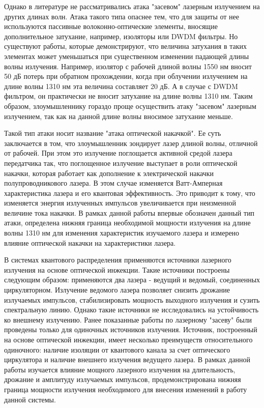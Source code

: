 Однако в литературе не рассматривались атака "засевом" лазерным излучением на других длинах волн. Атака такого типа опаснее тем, что для защиты от нее используются пассивные волоконно-оптические элементы, вносящие дополнительное затухание, например, изоляторы или DWDM фильтры. Но существуют работы, которые демонстрируют, что величина затухания в таких элементах может уменьшаться при существенном изменении падающей длины волны излучения. Например, изолятор с рабочей длиной волны 1550 нм вносит 50 дБ потерь при обратном прохождении, когда при облучении излучением на длине волны 1310 нм эта величина составляет 20 дБ. А в случае с DWDM фильтром, он практически не вносит затухание на длине волны 1310 нм. Таким образом, злоумышленнику гораздо проще осуществить атаку "засевом" лазерным излучением, так как на данной длине волны вносимое затухание меньше. 

Такой тип атаки носит название "атака оптической накачкой". Ее суть заключается в том, что злоумышленник зондирует лазер длиной волны, отличной от рабочей. При этом это излучение поглощается активной средой лазера передатчика так, что поглощенное излучение выступает в роли оптической накачки, которая работает как дополнение к электрической накачки полупроводникового лазера. В этом случае изменяется Ватт-Амперная характеристика лазера и его квантовая эффективность. Это приводит к тому, что изменяется энергия излученных импульсов увеличивается при неизменной величине тока накачки. В рамках данной работы впервые обозначен данный тип атаки, определена нижняя граница необходимой мощности излучения на длине волны 1310 нм для изменения характеристик изучаемого лазера и измерено влияние оптической накачки на характеристики лазера. 

В системах квантового распределения применяются источники лазерного излучения на основе оптической инжекции. Такие источники построены следующим образом: применяются два лазера - ведущий и ведомый, соединенных циркуляторном. Излучение ведомого лазера позволяет снизить дрожание излучаемых импульсов, стабилизировать мощность выходного излучения и сузить спектральную линию. Однако такие источники не исследовались на устойчивость ко внешнему излучению. Ранее показанные работы по лазерному "засеву" были проведены только для одиночных источников излучения. Источник, построенный на основе оптической инжекции, имеет несколько преимуществ относительного одиночного: наличие изоляции от квантового канала за счет оптического циркулятора и наличие внешнего излучения ведущего лазера. В рамках данной работы изучается влияние мощного лазерного излучения на длительность, дрожание и амплитуду излучаемых импульсов, продемонстрирована нижняя граница мощности излучения необходимого  для внесения изменений в работу данной системы.
